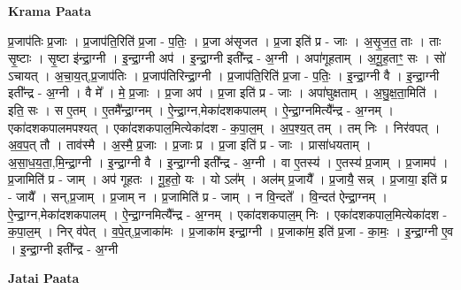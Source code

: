 \documentclass[17pt]{extarticle}
\begin{document}
\textbf{Krama Paata} \newline

प्र॒जाप॑तिः प्र॒जाः । प्र॒जाप॑ति॒रिति॑ प्र॒जा - प॒तिः॒ । प्र॒जा अ॑सृजत । प्र॒जा इति॑ प्र - जाः । अ॒सृ॒ज॒त॒ ताः । ताः सृ॒ष्टाः । सृ॒ष्टा इ॑न्द्रा॒ग्नी । इ॒न्द्रा॒ग्नी अप॑ । इ॒न्द्रा॒ग्नी इती᳚न्द्र - अ॒ग्नी । अपा॑गूहताम् । अ॒गू॒ह॒ताꣳ॒॒ सः । सो॑ ऽचायत् । अ॒चा॒य॒त्,प्र॒जाप॑तिः । प्र॒जाप॑तिरिन्द्रा॒ग्नी । प्र॒जाप॑ति॒रिति॑ प्र॒जा - प॒तिः॒ । इ॒न्द्रा॒ग्नी वै । इ॒न्द्रा॒ग्नी इती᳚न्द्र - अ॒ग्नी । वै मे᳚ । मे॒ प्र॒जाः । प्र॒जा अप॑ । प्र॒जा इति॑ प्र - जाः । अपा॑घुक्षताम् । अ॒घु॒क्ष॒ता॒मिति॑ । इति॒ सः । स ए॒तम् । ए॒तमै᳚न्द्रा॒ग्नम् । ऐ॒न्द्रा॒ग्न,मेका॑दशकपालम् । ऐ॒न्द्रा॒ग्नमित्यै᳚न्द्र - अ॒ग्नम् । एका॑दशकपालमपश्यत् । एका॑दशकपाल॒मित्येका॑दश - क॒पा॒ल॒म् । अ॒प॒श्य॒त् तम् । तम् निः । निर॑वपत् । अ॒व॒प॒त् तौ । ताव॑स्मै । अ॒स्मै॒ प्र॒जाः । प्र॒जाः प्र । प्र॒जा इति॑ प्र - जाः । प्रासा॑धयताम् । अ॒सा॒ध॒य॒ता॒,मि॒न्द्रा॒ग्नी । इ॒न्द्रा॒ग्नी वै । इ॒न्द्रा॒ग्नी इती᳚न्द्र - अ॒ग्नी । वा ए॒तस्य॑ । ए॒तस्य॑ प्र॒जाम् । प्र॒जामप॑ । प्र॒जामिति॑ प्र - जाम् । अप॑ गूहतः । गू॒ह॒तो॒ यः । यो ऽल᳚म् । अल॑म् प्र॒जायै᳚ । प्र॒जायै॒ सन्न् । प्र॒जाया॒ इति॑ प्र - जायै᳚ । सन्,प्र॒जाम् । प्र॒जाम् न । प्र॒जामिति॑ प्र - जाम् । न वि॒न्दते᳚ । वि॒न्दत॑ ऐन्द्रा॒ग्नम् । ऐ॒न्द्रा॒ग्न,मेका॑दशकपालम् । ऐ॒न्द्रा॒ग्नमित्यै᳚न्द्र - अ॒ग्नम् । एका॑दशकपाल॒म् निः । एका॑दशकपाल॒मित्येका॑दश - क॒पा॒ल॒म् । निर् व॑पेत् । व॒पे॒त्,प्र॒जाका॑मः । प्र॒जाका॑म इन्द्रा॒ग्नी । प्र॒जाका॑म॒ इति॑ प्र॒जा - का॒मः॒ । इ॒न्द्रा॒ग्नी ए॒व । इ॒न्द्रा॒ग्नी इती᳚न्द्र - अ॒ग्नी \newline

\textbf{Jatai Paata} \newline
\end{document}
